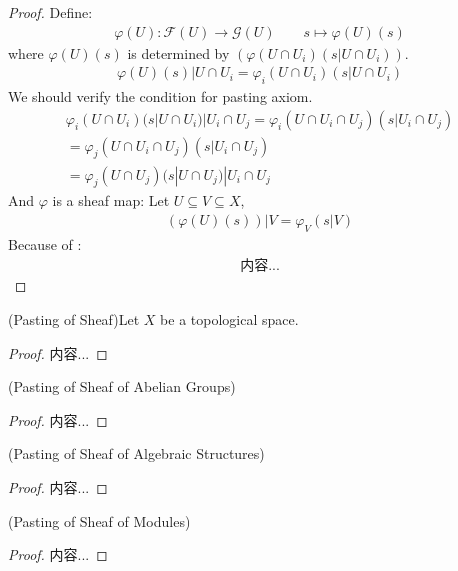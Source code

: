 \documentclass[Total.tex]{subfiles}
\begin{document}
				\begin{proof}
					Define:
					\begin{gather*}
						\varphi(U):\mathcal{F}(U)\rightarrow \mathcal{G}(U)\qquad s\mapsto \varphi(U)(s) 
					\end{gather*}
					where $\varphi(U)(s)$ is determined by $(\varphi(U\cap U_i)(s|U\cap U_i))$.
					\begin{gather*}
						\varphi(U)(s)|U\cap U_i=\varphi_i(U\cap U_i)(s|U\cap U_i)
					\end{gather*}
					We should verify the condition for pasting axiom. 
					\begin{gather*}
						\varphi_i(U\cap U_i)(s|U\cap U_i)|U_i\cap U_j=\varphi_i(U\cap U_i\cap U_j)(s|U_i\cap U_j)\\
						=\varphi_j(U\cap U_i\cap U_j)(s|U_i\cap U_j)\\
						=\varphi_j(U\cap U_j)(s|U\cap U_j)|U_i\cap U_j
					\end{gather*}
					And $\varphi$ is a sheaf map: Let $U\subseteq V\subseteq X$, 
					\begin{gather*}
						(\varphi(U)(s))|V=\varphi_V(s|V)
					\end{gather*}
					Because of :
					\begin{gather*}
						内容...
					\end{gather*}
				\end{proof}
				\begin{lemma}
					(Pasting of Sheaf)Let $X$ be a topological space. 
				\end{lemma}
				\begin{proof}
					内容...
				\end{proof}
				
				\begin{lemma}
					(Pasting of Sheaf of Abelian Groups)
				\end{lemma}
				\begin{proof}
					内容...
				\end{proof}
				
				\begin{lemma}
					(Pasting of Sheaf of Algebraic Structures)
				\end{lemma}
				\begin{proof}
					内容...
				\end{proof}
				
				\begin{lemma}
					(Pasting of Sheaf of Modules)
				\end{lemma}
				\begin{proof}
					内容...
				\end{proof}
		
\end{document}
